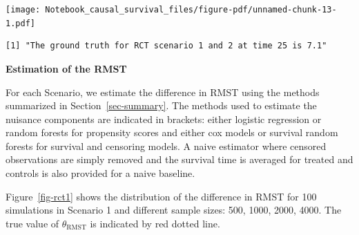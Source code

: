 \documentclass[
  11pt,
  a4paper,
]{article}
\newenvironment{Shaded}{}{}
\newcommand{\CommentTok}[1]{\textcolor[rgb]{0.42,0.45,0.49}{#1}}
\newcommand{\ControlFlowTok}[1]{\textcolor[rgb]{0.84,0.23,0.29}{#1}}
\newcommand{\FunctionTok}[1]{\textcolor[rgb]{0.44,0.26,0.76}{#1}}
\newcommand{\NormalTok}[1]{\textcolor[rgb]{0.14,0.16,0.18}{#1}}
\newcommand{\OtherTok}[1]{\textcolor[rgb]{0.44,0.26,0.76}{#1}}
\newcommand{\SpecialCharTok}[1]{\textcolor[rgb]{0.00,0.36,0.77}{#1}}
\theoremstyle{plain}
\theoremstyle{plain}
\theoremstyle{plain}
\theoremstyle{definition}
\theoremstyle{remark}
\begin{document}
\begin{Shaded}
\end{Shaded}

\texttt{[image: Notebook\_causal\_survival\_files/figure-pdf/unnamed-chunk-13-1.pdf]}

\begin{verbatim}
[1] "The ground truth for RCT scenario 1 and 2 at time 25 is 7.1"
\end{verbatim}

\textbf{Estimation of the RMST}

For each Scenario, we estimate the difference in RMST using the methods
summarized in Section~\ref{sec-summary}. The methods used to estimate
the nuisance components are indicated in brackets: either logistic
regression or random forests for propensity scores and either cox models
or survival random forests for survival and censoring models. A naive
estimator where censored observations are simply removed and the
survival time is averaged for treated and controls is also provided for
a naive baseline.

Figure~\ref{fig-rct1} shows the distribution of the difference in RMST
for 100 simulations in Scenario 1 and different sample sizes: 500, 1000,
2000, 4000. The true value of \(\theta_{\mathrm{RMST}}\) is indicated by
red dotted line.
\end{document}
